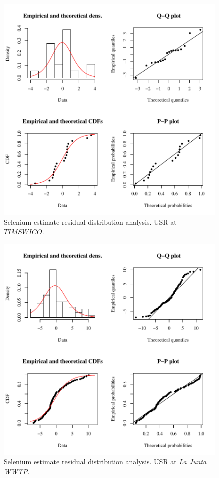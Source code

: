 \begin{figure}[htbp]
	\begin{center}
	\includegraphics[width=6in]{"Figures/Results_USR/Conc Model res-fit TIM"}
	\caption{Selenium estimate residual distribution analysis.  USR at $TIMSWICO$.}
	\end{center}
\end{figure}
\newpage

\begin{figure}[htbp]
	\begin{center}
	\includegraphics[width=6in]{"Figures/Results_USR/Conc Model res-fit WTP"}
	\caption{Selenium estimate residual distribution analysis.  USR at \textit{La Junta WWTP}.}
	\end{center}
\end{figure}
\newpage

